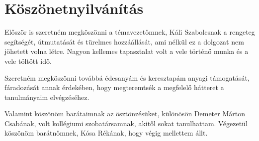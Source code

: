 \section*{Köszönetnyilvánítás} 
Először is szeretném megköszönni a témavezetőmnek, Káli Szabolcsnak a rengeteg segítségét, útmutatását és türelmes hozzáállását, ami nélkül ez a dolgozat nem jöhetett volna létre. Nagyon kellemes tapasztalat volt a vele történő munka és a vele töltött idő.


Szeretném megköszönni továbbá édesanyám és keresztapám anyagi támogatását, fáradozását annak érdekében, hogy megteremtsék a megfelelő hátteret a tanulmányaim elvégzéséhez.

Valamint köszönöm barátaimnak az ösztönzésüket, különösön Demeter Márton Csabának, volt kollégiumi szobatársamnak, akitől sokat tanulhattam. Végezetül köszönöm barátnőmnek, Kósa Rékának, hogy végig mellettem állt.